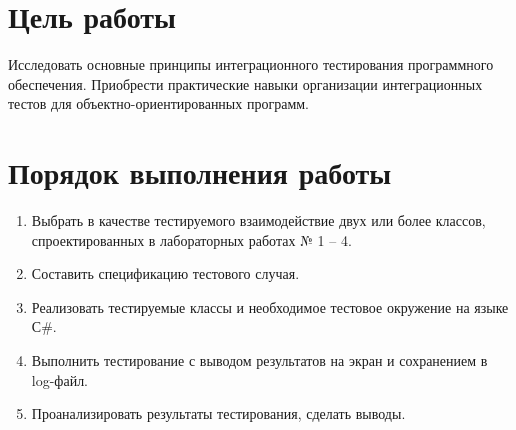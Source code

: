 \documentclass[a4paper,14pt]{extarticle}
\begin{document}

\section{Цель работы}
Исследовать основные принципы интеграционного тестирования
программного обеспечения. Приобрести практические навыки организации
интеграционных тестов для объектно-ориентированных программ.

\section{Порядок выполнения работы}
\begin{enumerate}
    \item Выбрать в качестве тестируемого взаимодействие двух или более
          классов, спроектированных в лабораторных работах № 1 – 4.
    \item Составить спецификацию тестового случая.
    \item Реализовать тестируемые классы и необходимое тестовое
          окружение на языке С\#.
    \item Выполнить тестирование с выводом результатов на экран и
          сохранением в log-файл.
    \item Проанализировать результаты тестирования, сделать выводы.
\end{enumerate}
\end{document}
